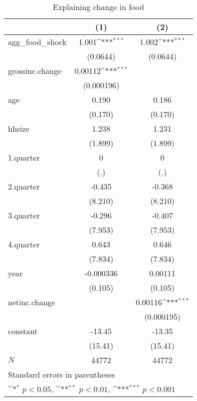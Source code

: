 \begin{table}[htbp]\centering
\def\sym#1{\ifmmode^{#1}\else\(^{#1}\)\fi}
\caption{\label{tab:food-deltacons} Explaining change in food}
\begin{tabular}{l*{2}{c}}
\hline\hline
            &\multicolumn{1}{c}{(1)}         &\multicolumn{1}{c}{(2)}         \\
\hline
agg\_food\_shock&       1.001\sym{***}&       1.002\sym{***}\\
            &    (0.0644)         &    (0.0644)         \\
grossinc.change&     0.00112\sym{***}&                     \\
            &  (0.000196)         &                     \\
age         &       0.190         &       0.186         \\
            &     (0.170)         &     (0.170)         \\
hhsize      &       1.238         &       1.231         \\
            &     (1.899)         &     (1.899)         \\
1.quarter   &           0         &           0         \\
            &         (.)         &         (.)         \\
2.quarter   &      -0.435         &      -0.368         \\
            &     (8.210)         &     (8.210)         \\
3.quarter   &      -0.296         &      -0.407         \\
            &     (7.953)         &     (7.953)         \\
4.quarter   &       0.643         &       0.646         \\
            &     (7.834)         &     (7.834)         \\
year        &   -0.000336         &     0.00111         \\
            &     (0.105)         &     (0.105)         \\
netinc.change&                     &     0.00116\sym{***}\\
            &                     &  (0.000195)         \\
constant    &      -13.45         &      -13.35         \\
            &     (15.41)         &     (15.41)         \\
\hline
\(N\)       &       44772         &       44772         \\
\hline\hline
\multicolumn{3}{l}{\footnotesize Standard errors in parentheses}\\
\multicolumn{3}{l}{\footnotesize \sym{*} \(p<0.05\), \sym{**} \(p<0.01\), \sym{***} \(p<0.001\)}\\
\end{tabular}
\end{table}
